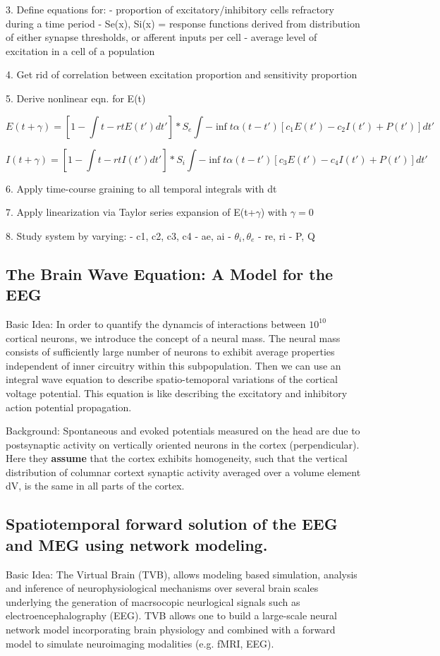 \documentclass{article}
\begin{document}
3. Define equations for:
- proportion of excitatory/inhibitory cells refractory during a time period
- Se(x), Si(x) = response functions derived from distribution of either synapse thresholds, or afferent inputs per cell
- average level of excitation in a cell of a population

4. Get rid of correlation between excitation proportion and sensitivity proportion

5. Derive nonlinear eqn. for E(t)

\[E(t+\gamma) = [1 - \int{t-r}{t}E(t')dt'] * S_e{\int{-\inf}{t}\alpha{(t-t')} [c_1 E(t') - c_2 I(t') + P(t')]dt'}\]

\[
I(t+\gamma) = [1 - \int{t-r}{t}I(t')dt'] * S_i{\int{-\inf}{t}\alpha{(t-t')} [c_3 E(t') - c_4 I(t') + P(t')]dt'}
\]

6. Apply time-course graining to all temporal integrals with dt

7. Apply linearization via Taylor series expansion of E(t+$\gamma$) with $\gamma{}=0$

8. Study system by varying:
	- c1, c2, c3, c4
	- ae, ai
	- $\theta_i, \theta_e$
	- re, ri
	- P, Q

\subsection{The Brain Wave Equation: A Model for the EEG}
\cite{Nunez1974}
Basic Idea: In order to quantify the dynamcis of interactions between $10^{10}$ cortical neurons, we introduce the concept of a neural mass. The neural mass consists of sufficiently large number of neurons to exhibit average properties independent of inner circuitry within this subpopulation. Then we can use an integral wave equation to describe spatio-temoporal variations of the cortical voltage potential. This equation is like describing the excitatory and inhibitory action potential propagation.

Background: Spontaneous and evoked potentials measured on the head are due to postsynaptic activity on vertically oriented neurons in the cortex (perpendicular). Here they \textbf{assume} that the cortex exhibits homogeneity, such that the vertical distribution of columnar cortext synaptic activity averaged over a volume element dV, is the same in all parts of the cortex. 

\subsection{Spatiotemporal forward solution of the EEG and MEG using network modeling.}
\cite{Ritter2013}
Basic Idea:
The Virtual Brain (TVB), allows modeling based simulation, analysis and inference of neurophysiological mechanisms over several brain scales underlying the generation of macrsocopic neurlogical signals such as electroencephalography (EEG). TVB allows one to build a large-scale neural network model incorporating brain physiology and combined with a forward model to simulate neuroimaging modalities (e.g. fMRI, EEG).
\end{document}
